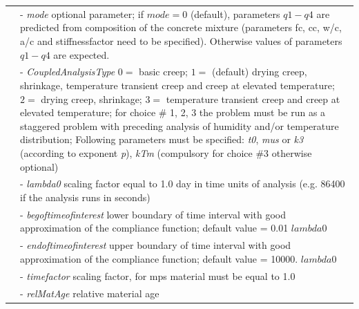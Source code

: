 \documentclass[a4paper]{article}
\newcommand{\param}[1]{{\it #1}}
\newenvironment{mmt}{\begin{tabular}{|l|p{9cm}|}}{\end{tabular}\\}
\newenvironment{mmt}{\begin{tabular}{|l|l|}}{\end{tabular}\\}
\begin{document}
\begin{table}[!htb]
\begin{mmt}
&- \param{mode} optional parameter; if $mode = 0$ (default),  parameters $q1-q4$ are predicted from composition of the concrete mixture (parameters fc, cc, w/c, a/c and stiffnessfactor need to be specified). Otherwise values of parameters $q1-q4$ are expected.\\
&- \param{CoupledAnalysisType} $0=$ basic creep; $1=$ (default) drying creep, shrinkage, temperature transient creep and creep at elevated temperature; $2=$ drying creep, shrinkage; $3=$ temperature transient creep and creep at elevated temperature; for choice \# 1, 2, 3 the problem must be run as a staggered problem with preceding analysis of humidity and/or temperature distribution; 
Following parameters must be specified: \param{t0}, \param{mus} or \param{k3} (according to exponent \param{p}), \param{kTm} (compulsory for choice \#3 otherwise optional)\\
%
&- \param{lambda0} scaling factor equal to 1.0 day in time units of analysis (e.g. 86400 if the analysis runs in seconds)\\
&- \param{begoftimeofinterest} lower boundary of time interval with good approximation of the compliance function; default value = 0.01 $lambda0$\\  
&- \param{endoftimeofinterest} upper boundary of time interval with good approximation of the compliance function; default value = 10000. $lambda0$\\  
&- \param{timefactor} scaling factor, for mps material must be equal to 1.0\\
&- \param{relMatAge} relative material age\\
%
\hline
\end{mmt}
\end{table}
\end{document}
